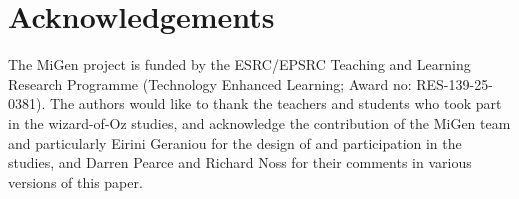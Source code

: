 \documentclass[authoryear,preprint,12pt]{elsarticle}
\begin{document}











\appendix



\section*{Acknowledgements} 

The MiGen project is funded by the ESRC/EPSRC Teaching and
Learning Research Programme (Technology Enhanced Learning; Award no:
RES-139-25-0381). The authors would
like to thank the teachers and students who took part in the
wizard-of-Oz studies, and acknowledge the contribution of the MiGen team and
particularly Eirini Geraniou for the design of and
 participation in the studies, and Darren Pearce and Richard Noss for their comments in various versions of this paper. 




\end{document}
